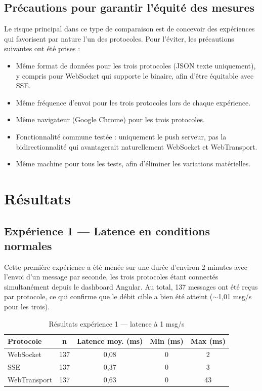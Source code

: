 \subsection{Précautions pour garantir l'équité des mesures}

Le risque principal dans ce type de comparaison est de concevoir des expériences qui favorisent par nature l'un des protocoles. Pour l'éviter, les précautions suivantes ont été prises :

\begin{itemize}
    \item Même format de données pour les trois protocoles (JSON texte uniquement), y compris pour WebSocket qui supporte le binaire, afin d'être équitable avec SSE.
    \item Même fréquence d'envoi pour les trois protocoles lors de chaque expérience.
    \item Même navigateur (Google Chrome) pour les trois protocoles.
    \item Fonctionnalité commune testée : uniquement le push serveur, pas la bidirectionnalité qui avantagerait naturellement WebSocket et WebTransport.
    \item Même machine pour tous les tests, afin d'éliminer les variations matérielles.
\end{itemize}

\section{Résultats}

\subsection{Expérience 1 --- Latence en conditions normales}

Cette première expérience a été menée sur une durée d'environ 2 minutes avec l'envoi d'un message par seconde, les trois protocoles étant connectés simultanément depuis le dashboard Angular. Au total, 137 messages ont été reçus par protocole, ce qui confirme que le débit cible a bien été atteint ($\sim$1,01 msg/s pour les trois).

\begin{table}[H]
\centering
\begin{tabular}{|l|c|c|c|c|}
\hline
\textbf{Protocole} & \textbf{n} & \textbf{Latence moy. (ms)} & \textbf{Min (ms)} & \textbf{Max (ms)} \\
\hline
WebSocket & 137 & 0,08 & 0 & 2 \\
SSE & 137 & 0,37 & 0 & 3 \\
WebTransport & 137 & 0,63 & 0 & 43 \\
\hline
\end{tabular}
\caption{Résultats expérience 1 --- latence à 1 msg/s}
\end{table}

